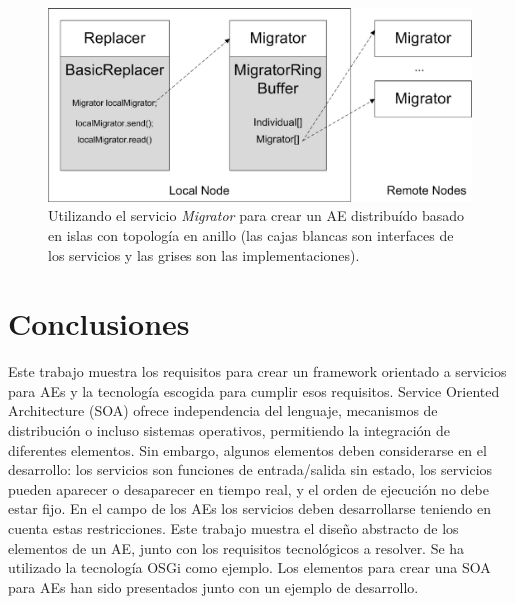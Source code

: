 \documentclass[runningheads]{llncs}
\begin{document}
\begin{figure}[ht] 
\begin{center} 
\includegraphics[scale=0.6]{images/migrator.eps}
\end{center} 
\caption{Utilizando el servicio {\em Migrator} para crear un AE distribuído basado en islas con topología en anillo (las cajas blancas son interfaces de los servicios y las grises son las implementaciones).} 
\label{MIGRATOR} 
\end{figure} 


\section{Conclusiones}
\label{sec:conclusions}
Este trabajo muestra los requisitos para crear un framework orientado a servicios para AEs y la tecnología escogida para cumplir esos requisitos.  Service Oriented Architecture (SOA) ofrece independencia del lenguaje, mecanismos de distribución o incluso sistemas operativos, permitiendo la integración de diferentes elementos. Sin embargo, algunos elementos deben considerarse en el desarrollo: los servicios son funciones de entrada/salida sin estado, los servicios pueden aparecer o desaparecer en tiempo real, y el orden de ejecución no debe estar fijo. En el campo de los AEs los servicios deben desarrollarse teniendo en cuenta estas restricciones. Este trabajo muestra el diseño abstracto de los elementos de un AE, junto con los requisitos tecnológicos a resolver. Se ha utilizado la tecnología OSGi como ejemplo. Los elementos para crear una SOA para AEs han sido presentados junto con un ejemplo de desarrollo.
\end{document}
